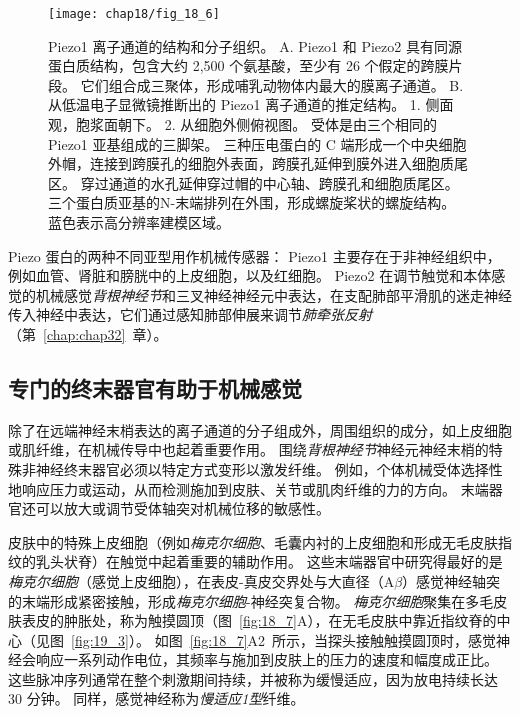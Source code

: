 \begin{figure}[htbp]
	\centering
	\texttt{[image: chap18/fig\_18\_6]}
	\caption{Piezo1 离子通道的结构和分子组织。
		A. Piezo1 和 Piezo2 具有同源蛋白质结构，包含大约 2,500 个氨基酸，至少有 26 个假定的跨膜片段。
		它们组合成三聚体，形成哺乳动物体内最大的膜离子通道\cite{murthy2017piezos}。
		B. 从低温电子显微镜推断出的 Piezo1 离子通道的推定结构。
		1. 侧面观，胞浆面朝下。
		2. 从细胞外侧俯视图。
		受体是由三个相同的 Piezo1 亚基组成的三脚架。
		三种压电蛋白的 C 端形成一个中央细胞外帽，连接到跨膜孔的细胞外表面，跨膜孔延伸到膜外进入细胞质尾区。
		穿过通道的水孔延伸穿过帽的中心轴、跨膜孔和细胞质尾区。
		三个蛋白质亚基的N-末端排列在外围，形成螺旋桨状的螺旋结构。 
		蓝色表示高分辨率建模区域\cite{saotome2018structure}。}
	\label{fig:18_6}
\end{figure}



Piezo 蛋白的两种不同亚型用作机械传感器：
Piezo1 主要存在于非神经组织中，例如血管、肾脏和膀胱中的上皮细胞，以及红细胞。
Piezo2 在调节触觉和本体感觉的机械感觉\textit{背根神经节}和三叉神经神经元中表达，在支配肺部平滑肌的迷走神经传入神经中表达，它们通过感知肺部伸展来调节\textit{肺牵张反射}（第~\ref{chap:chap32}~章）。



\subsection{专门的终末器官有助于机械感觉}

除了在远端神经末梢表达的离子通道的分子组成外，周围组织的成分，如上皮细胞或肌纤维，在机械传导中也起着重要作用。
围绕\textit{背根神经节}神经元神经末梢的特殊非神经终末器官必须以特定方式变形以激发纤维。
例如，个体机械受体选择性地响应压力或运动，从而检测施加到皮肤、关节或肌肉纤维的力的方向。
末端器官还可以放大或调节受体轴突对机械位移的敏感性。


皮肤中的特殊上皮细胞（例如\textit{梅克尔细胞}、毛囊内衬的上皮细胞和形成无毛皮肤指纹的乳头状脊）在触觉中起着重要的辅助作用。
这些末端器官中研究得最好的是\textit{梅克尔细胞}（感觉上皮细胞），在表皮-真皮交界处与大直径（A$\beta$）感觉神经轴突的末端形成紧密接触，形成\textit{梅克尔细胞}-神经突复合物。
\textit{梅克尔细胞}聚集在多毛皮肤表皮的肿胀处，称为触摸圆顶（图~\ref{fig:18_7}A），在无毛皮肤中靠近指纹脊的中心（见图~\ref{fig:19_3}）。
如图~\ref{fig:18_7}A2~所示，当探头接触触摸圆顶时，感觉神经会响应一系列动作电位，其频率与施加到皮肤上的压力的速度和幅度成正比。
这些脉冲序列通常在整个刺激期间持续，并被称为缓慢适应，因为放电持续长达 30 分钟。
同样，感觉神经称为\textit{慢适应1型}纤维。


